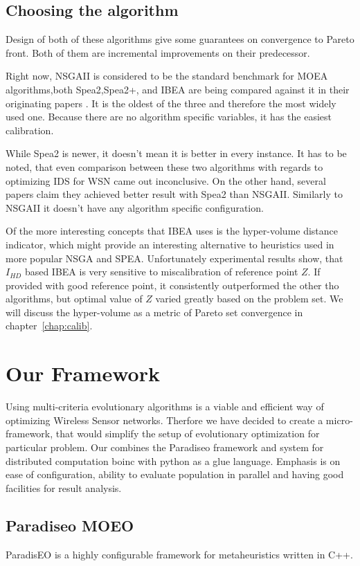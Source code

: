 \documentclass[12pt,oneside]{fithesis2}
\begin{document}
\section{Choosing the algorithm}
Design of both of these algorithms give some guarantees on convergence to Pareto front. Both of them are incremental improvements on their predecessor. 

Right now, NSGAII is considered to be the standard benchmark for MOEA algorithms,both Spea2,Spea2+, and IBEA are being compared against it in their originating papers . It is the oldest of the three and therefore the most widely used one. Because there are no algorithm specific variables, it has the easiest calibration.
       
       While Spea2 is newer, it doesn't mean it is better in every instance. It has to be noted, that even comparison between these two algorithms with regards to optimizing IDS for WSN came out inconclusive.\cite{stehl2013opt} On the other hand, several papers claim they achieved better result with Spea2 than NSGAII. Similarly to NSGAII it doesn't have any algorithm specific configuration.  

Of the more interesting concepts that IBEA uses is the hyper-volume distance indicator, which might provide an interesting alternative to heuristics used in more popular NSGA and SPEA. Unfortunately experimental results show\cite{zitzler2004indicator}, that $I_{HD}$ based IBEA is very sensitive to miscalibration of reference point $Z$. If provided with good reference point, it consistently outperformed the other tho algorithms, but optimal value of $Z$ varied greatly based on the problem set. We will discuss the hyper-volume as a metric of Pareto set convergence in chapter~\ref{chap:calib}.


\chapter{Our Framework}
\label{chap:framework}
Using multi-criteria evolutionary algorithms is a viable and efficient way of optimizing Wireless Sensor networks\cite{stehl2013opt}. Therfore we have decided to create a micro-framework, that would simplify the setup of evolutionary optimization for particular problem.
Our combines the Paradiseo framework and system for distributed computation boinc with python as a glue language. Emphasis is on ease of configuration, ability to evaluate population in parallel and having good facilities for result analysis.

\section{Paradiseo MOEO}
ParadisEO is a highly configurable framework for metaheuristics written in C++.\cite{liefooghe2007Paradiseo} 
\end{document}
